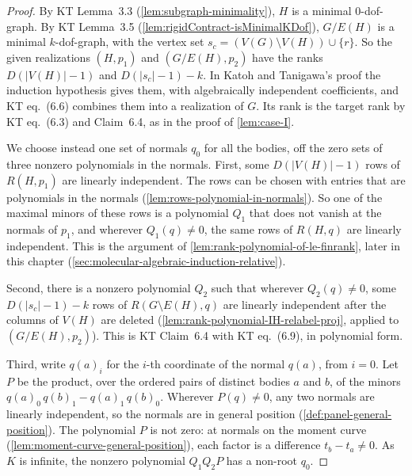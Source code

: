 \begin{proof}
  \leanok
  By KT Lemma~3.3 (\cref{lem:subgraph-minimality}), $H$ is a minimal
  $0$-dof-graph. By KT Lemma~3.5 (\cref{lem:rigidContract-isMinimalKDof}),
  $G/E(H)$ is a minimal $k$-dof-graph, with the vertex set
  $s_c = (V(G) \setminus V(H)) \cup \{r\}$. So the given realizations
  $(H, p_1)$ and $(G/E(H), p_2)$ have the ranks $D(|V(H)| - 1)$ and
  $D(|s_c| - 1) - k$. In Katoh and Tanigawa's proof the induction
  hypothesis gives them, with algebraically independent coefficients,
  and KT eq.~(6.6) combines them into a realization of $G$. Its rank is
  the target rank by KT eq.~(6.3) and Claim~6.4, as in the proof of
  \cref{lem:case-I}.

  We choose instead one set of normals $q_0$ for all the bodies, off the
  zero sets of three nonzero polynomials in the normals. First, some
  $D(|V(H)| - 1)$ rows of $R(H, p_1)$ are linearly independent. The rows
  can be chosen with entries that are polynomials in the normals
  (\cref{lem:rows-polynomial-in-normals}). So one of the maximal minors
  of these rows is a polynomial $Q_1$ that does not vanish at the normals
  of $p_1$, and wherever $Q_1(q) \neq 0$, the same rows of $R(H, q)$ are
  linearly independent. This is the argument of
  \cref{lem:rank-polynomial-of-le-finrank}, later in this chapter
  (\cref{sec:molecular-algebraic-induction-relative}).

  Second, there is a nonzero polynomial $Q_2$ such that wherever
  $Q_2(q) \neq 0$, some $D(|s_c| - 1) - k$ rows of
  $R(G \setminus E(H), q)$ are linearly independent after the columns of
  $V(H)$ are deleted (\cref{lem:rank-polynomial-IH-relabel-proj}, applied
  to $(G/E(H), p_2)$). This is KT Claim~6.4 with KT eq.~(6.9), in
  polynomial form.

  Third, write $q(a)_i$ for the $i$-th coordinate of the normal $q(a)$,
  from $i = 0$. Let $P$ be the product, over the ordered pairs of
  distinct bodies $a$ and $b$, of the minors
  $q(a)_0\,q(b)_1 - q(a)_1\,q(b)_0$. Wherever $P(q) \neq 0$, any two
  normals are linearly independent, so the normals are in general
  position (\cref{def:panel-general-position}). The polynomial $P$ is not
  zero: at normals on the moment curve
  (\cref{lem:moment-curve-general-position}), each factor is a difference
  $t_b - t_a \neq 0$. As $K$ is infinite, the nonzero polynomial
  $Q_1 Q_2 P$ has a non-root $q_0$.


\end{proof}

